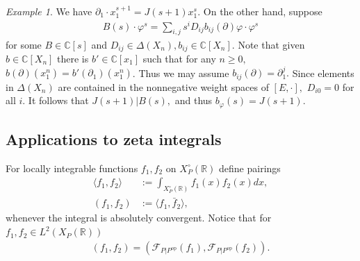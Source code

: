 \documentclass[11pt,a4paper,usenames,dvipsnames,reqno]{amsart}
\numberwithin{equation}{section}
\newcommand{\cc}{\mathbb C}
\newcommand{\rr}{\mathbb R}
\theoremstyle{definition}
\theoremstyle{remark}
\newtheorem{Ex}[Thm]{Example}
\begin{document}
\begin{Ex}
We have $\partial_1\cdot x_1^{s+1}=J(s+1)x_1^s.$ On the other hand, suppose 
\begin{align*}
    B(s)\cdot \varphi^s=\sum_{i,j} s^iD_{ij}b_{ij}(\partial)\varphi\cdot \varphi^{s}
\end{align*}
for some $B\in \cc[s]$ and $D_{ij}\in \Delta(X_n), b_{ij}\in \cc[X_n].$ Note that given $b\in \cc[X_n]$ there is $b'\in \cc[x_1]$ such that for any $n\ge 0,$ $b(\partial)(x_1^n)=b'(\partial_1)(x_1^n)$.  Thus we may assume $b_{ij}(\partial)=\partial_1^j.$ Since elements in $\Delta(X_n)$ are contained in the nonnegative weight spaces of $[E,\cdot],$ $D_{i0}=0$ for all $i$. It follows that $J(s+1)|B(s),$ and thus $b_\varphi(s)=J(s+1)$.
\end{Ex}

\subsection{Applications to zeta integrals}

For locally integrable functions $f_1,f_2$ on $X_P^\circ(\rr)$ define pairings
\begin{align*}
    \langle f_1,f_2\rangle&:=\int_{X_P^\circ(\rr)} f_1(x)f_2(x)dx,\\
    (f_1,f_2)&:=\langle f_1,\bar{f}_2\rangle,
\end{align*}
whenever the integral is absolutely convergent. Notice that for $f_1,f_2\in L^2(X_P(\rr))$
\begin{align*}
    (f_1,f_2)=(\mathcal{F}_{P|P^{\mathrm{op}}}(f_1),\mathcal{F}_{P|P^{\mathrm{op}}}(f_2)).
\end{align*}
 
\end{document}
